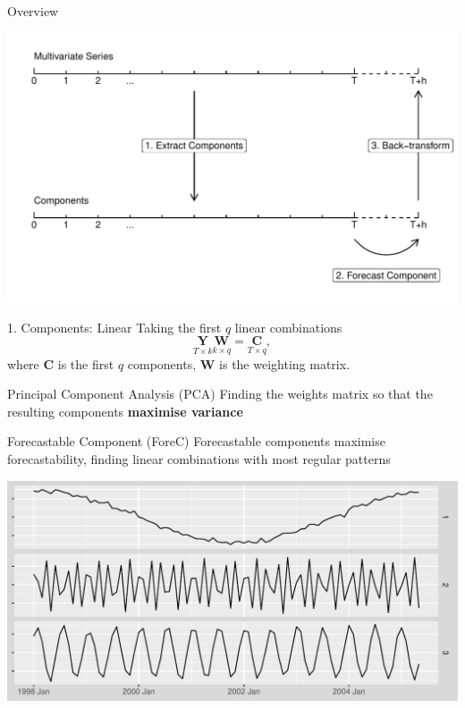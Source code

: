 \documentclass[14pt,ignorenonframetext,]{beamer}
\begin{document}
\begin{frame}{Overview}
\protect\hypertarget{overview-1}{}
\begin{center}
\includegraphics[width=\linewidth]{plot/p_timeline}
\end{center}
\end{frame}

\begin{frame}{1. Components: Linear}
\protect\hypertarget{components-linear}{}
Taking the first \(q\) linear combinations
\[\underset{T\times k}{\bm{Y}}\underset{k\times q}{\bm{W}}=\underset{T\times q}{\bm{C}},\]
where \(\bm{C}\) is the first \(q\) components, \(\bm{W}\) is the
weighting matrix.

\begin{block}{Principal Component Analysis (PCA)}
\protect\hypertarget{principal-component-analysis-pca}{}
Finding the weights matrix so that the resulting components
\alert{\textbf{maximise variance}}
\end{block}
\end{frame}

\begin{frame}
\begin{block}{Forecastable Component (ForeC)}
\protect\hypertarget{forecastable-component-forec}{}
Forecastable components \citep{Goerg2013-yu} maximise
\alert{forecastability}, finding linear combinations with
\alert{most regular patterns}

\centerline{\includegraphics[width=\linewidth]{plot/p_forec}}
\end{block}
\end{frame}
\end{document}
